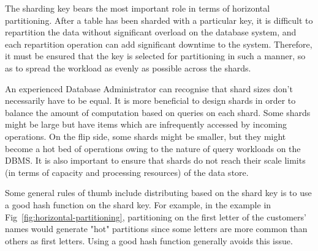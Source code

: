 The sharding key bears the most important role in terms of horizontal partitioning. After a table has been sharded with a particular key, it is difficult to repartition the data without significant overload on the database system, and each repartition operation can add significant downtime to the system. Therefore, it must be ensured that the key is selected for partitioning in such a manner, so as to spread the workload as evenly as possible across the shards.

An experienced Database Administrator can recognise that shard sizes don't necessarily have to be equal. It is more beneficial to design shards in order to balance the amount of computation based on queries on each shard. Some shards might be large but have items which are infrequently accessed by incoming operations. On the flip side, some shards might be smaller, but they might become a hot bed of operations owing to the nature of query workloads on the DBMS. It is also important to ensure that shards do not reach their scale limits (in terms of capacity and processing resources) of the data store.

Some general rules of thumb include distributing based on the shard key is to use a good hash function on the shard key. For example, in the example in Fig~\ref{fig:horizontal-partitioning}, partitioning on the first letter of the customers' names would generate "hot" partitions since some letters are more common than others as first letters. Using a good hash function generally avoids this issue.

